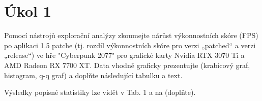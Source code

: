 \section*{Úkol 1}
\label{sec:task-1}

Pomocí nástrojů explorační analýzy zkoumejte nárůst výkonnostních skóre (FPS) po aplikaci 1.5 patche (tj. rozdíl výkonnostních skóre pro verzi „patched“ a verzi „release“) ve hře "Cyberpunk 2077" pro grafické karty Nvidia RTX 3070 Ti a AMD Radeon RX 7700 XT. Data vhodně graficky prezentujte (krabicový graf, histogram, q-q graf) a doplňte následující tabulku a text.

\vspace{2em}
\noindent
Výsledky popisné statistiky lze vidět v Tab. 1 a na \TODO (doplňte).
\vspace{2em}

\newcommand{\rangeValues}       {0, 0, 0, 0}
\newcommand{\minValues}         {0, 0, 0, 0}
\newcommand{\QfValues}          {0, 0, 0, 0}
\newcommand{\medianValues}      {0, 0, 0, 0}
\newcommand{\meanValues}        {0, 0, 0, 0}
\newcommand{\QtValues}          {0, 0, 0, 0}
\newcommand{\maxValues}         {0, 0, 0, 0}
\newcommand{\sdValues}          {0, 0, 0, 0}
\newcommand{\cvValues}          {0, 0, 0, 0}
\newcommand{\skewnessValues}    {0, 0, 0, 0}
\newcommand{\kurtosisValues}    {0, 0, 0, 0}
\newcommand{\lowerBoundValues}  {0, 0, 0, 0}
\newcommand{\upperBoundValues}  {0, 0, 0, 0}

\newcommand{\tableValue}[2]{%
    \pgfmathparse{{#1}[#2]}%
    \pgfmathresult%
}

